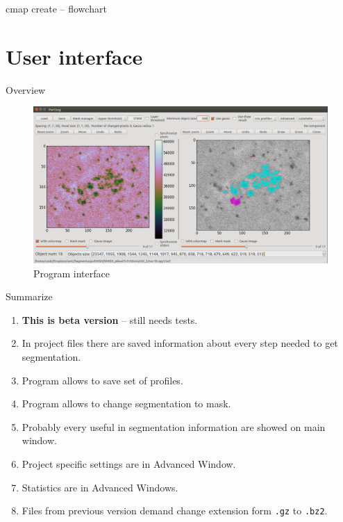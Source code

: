 \documentclass[10pt,usenames,dvipsnames]{beamer}
\begin{document}
\begin{frame}[c]{cmap create – flowchart}
\end{frame}

\section{User interface}
\begin{frame}[c]{Overview}
  \begin{figure}[htpb]
    \centering
    \includegraphics[width=1\linewidth]{interface}
    \caption{Program interface}
    \label{fig:name}
  \end{figure}
\end{frame}
\begin{frame}[c]{Summarize}
  \begin{enumerate}
    \item \textbf{This is beta version} – still needs tests.
    \item In project files there are saved information about every step needed to get segmentation. 
    \item Program allows to save set of profiles.
    \item Program allows to change segmentation to mask. 
    \item Probably every useful in segmentation information are showed on main window.
    \item Project specific settings are in Advanced Window.
    \item Statistics are in Advanced Windows.
    \item Files from previous version demand change extension form \texttt{.gz} to \texttt{.bz2}.
  \end{enumerate}  
\end{frame}
\end{document}

